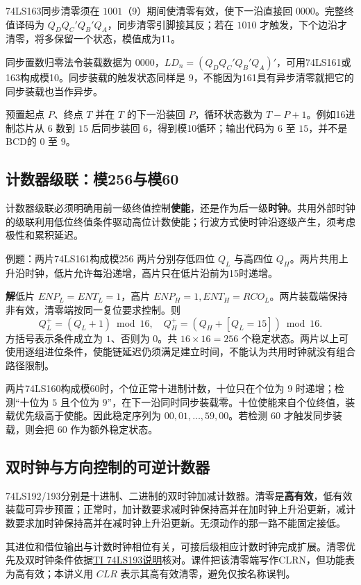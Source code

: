 \documentclass[UTF8,fontset=none,zihao=-4,a4paper]{ctexart}
\newcommand{\sol}{\par\noindent\textbf{解}\quad}
\begin{document}
74LS163同步清零须在 $1001$（9）期间使清零有效，使下一沿直接回 $0000$。完整终值译码为 $Q_DQ_C'Q_B'Q_A$，同步清零引脚接其反；若在 $1010$ 才触发，下个边沿才清零，将多保留一个状态，模值成为11。

同步置数归零法令装载数据为 $0000$，$LD_n=(Q_DQ_C'Q_B'Q_A)'$，可用74LS161或163构成模10。同步装载的触发状态同样是 $9$，不能因为161具有异步清零就把它的同步装载也当作异步。

预置起点 $P$、终点 $T$ 并在 $T$ 的下一沿装回 $P$，循环状态数为 $T-P+1$。例如16进制芯片从 $6$ 数到 $15$ 后同步装回 $6$，得到模10循环；输出代码为 $6$ 至 $15$，并不是BCD的 $0$ 至 $9$。

\subsection{计数器级联：模256与模60}
计数器级联必须明确用前一级终值控制\textbf{使能}，还是作为后一级\textbf{时钟}。共用外部时钟的级联利用低位终值条件驱动高位计数使能；行波方式使时钟沿逐级产生，须考虑极性和累积延迟。

\begin{infobox}{例题：两片74LS161构成模256}
两片分别存低四位 $Q_L$ 与高四位 $Q_H$。两片共用上升沿时钟，低片允许每沿递增，高片只在低片沿前为15时递增。
\end{infobox}
\sol 低片 $ENP_L=ENT_L=1$，高片 $ENP_H=1,ENT_H=RCO_L$。两片装载端保持非有效，清零端按同一复位要求控制。则
\[
Q_L^+=(Q_L+1)\bmod16,\quad
Q_H^+=(Q_H+[Q_L=15])\bmod16.
\]
方括号表示条件成立为 $1$、否则为 $0$。共 $16\times16=256$ 个稳定状态。两片以上可使用逐组进位条件，使能链延迟仍须满足建立时间，不能认为共用时钟就没有组合路径限制。

两片74LS160构成模60时，个位正常十进制计数，十位只在个位为 $9$ 时递增；检测“十位为 $5$ 且个位为 $9$”，在下一沿同时同步装载零。十位使能来自个位终值，装载优先级高于使能。因此稳定序列为 $00,01,\ldots,59,00$。若检测 $60$ 才触发同步装载，则会把 $60$ 作为额外稳定状态。

\subsection{双时钟与方向控制的可逆计数器}
74LS192/193分别是十进制、二进制的双时钟加减计数器。清零是\textbf{高有效}，低有效装载可异步预置；正常时，加计数要求减时钟保持高并在加时钟上升沿更新，减计数要求加时钟保持高并在减时钟上升沿更新。无须动作的那一路不能固定接低。

其进位和借位输出与计数时钟相位有关，可接后级相应计数时钟完成扩展。清零优先及双时钟条件依据\href{https://www.ti.com/product/SN74LS193}{TI 74LS193说明}核对。课件把该清零端写作CLRN，但功能表为高有效；本讲义用 $CLR$ 表示其高有效清零，避免仅按名称误判。
\end{document}
